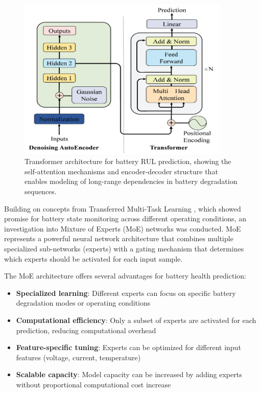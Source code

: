 \begin{figure}[htbp]
\centering
\includegraphics[width=0.9\textwidth]{imgs/transformer_arq.png}
\caption{Transformer architecture for battery RUL prediction, showing the self-attention mechanisms and encoder-decoder structure that enables modeling of long-range dependencies in battery degradation sequences\cite{chen_transformer_2022}.}
\label{fig:transformer_architecture}
\end{figure}

Building on concepts from Transferred Multi-Task Learning \cite{che_battery_2023}, which showed promise for battery state monitoring across different operating conditions, an investigation into Mixture of Experts (MoE) networks was conducted. MoE represents a powerful neural network architecture that combines multiple specialized sub-networks (experts) with a gating mechanism that determines which experts should be activated for each input sample.

The MoE architecture offers several advantages for battery health prediction:

\begin{itemize}
    \item \textbf{Specialized learning}: Different experts can focus on specific battery degradation modes or operating conditions
    \item \textbf{Computational efficiency}: Only a subset of experts are activated for each prediction, reducing computational overhead
    \item \textbf{Feature-specific tuning}: Experts can be optimized for different input features (voltage, current, temperature)
    \item \textbf{Scalable capacity}: Model capacity can be increased by adding experts without proportional computational cost increase
\end{itemize}

